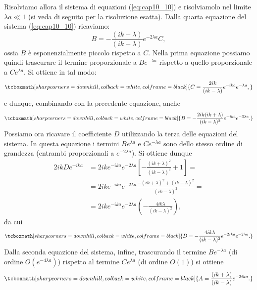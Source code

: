 Risolviamo allora il sistema di equazioni (\ref{eq:cap10_10}) e risolviamolo nel limite ${\lambda a \ll 1}$ (si veda di seguito per la risoluzione esatta). Dalla quarta equazione del sistema (\ref{eq:cap10_10}) ricaviamo:
	\begin{equation}
		B=-\frac{(ik+\lambda)}{(ik-\lambda)}e^{-2 \lambda a } C,
	\end{equation}
ossia $B$ è esponenzialmente piccolo rispetto a $C$.  Nella prima equazione possiamo quindi trascurare il termine proporzionale a $Be^{-\lambda a}$ rispetto a quello proporzionale a $Ce^{\lambda a }$. Si ottiene in tal modo:
	\begin{equation}
		\tcboxmath[sharp corners=downhill, colback=white, colframe=black]{
			C= \frac{2ik}{(ik-\lambda)}e^{-ika}e^{-\lambda a},
			}
	\end{equation}
e dunque, combinando con la precedente equazione, anche
	\begin{equation}
		\tcboxmath[sharp corners=downhill, colback=white, colframe=black]{
			B=-\frac{2ik(ik+\lambda)}{(ik-\lambda)^2}e^{-ik a }e^{-3 \lambda a }.
			}
	\end{equation}
Possiamo ora ricavare il coefficiente $D$ utilizzando la terza delle equazioni del sistema. In questa equazione i termini $Be^{\lambda a }$ e $Ce^{-\lambda a }$ sono dello stesso ordine di grandezza (entrambi proporzionali a $e^{-2\lambda a}$). Si ottiene dunque
	\begin{align}
		2ikDe^{-ika}&= 2ike^{-ika}e^{-2\lambda a} \left[-\frac{(ik+\lambda)^2}{(ik-\lambda)^2}+1\right]= \nonumber \\
		&= 2ike^{-ika}e^{-2\lambda a}\frac{-(ik+\lambda)^2+(ik-\lambda)^2}{(ik-\lambda)^2}= \nonumber \\
		&= 2ike^{-ika}e^{-2\lambda a}\left( -\frac{4ik\lambda}{(ik-\lambda)^2}\right),
	\end{align}
da cui
	\begin{equation}
		\tcboxmath[sharp corners=downhill, colback=white, colframe=black]{
			D= -\frac{4ik\lambda}{(ik-\lambda)^2}e^{-2ika}e^{-2\lambda a}.
			}
	\end{equation}
Dalla seconda equazione del sistema, infine, trascurando il termine $Be^{-\lambda a}$ (di ordine $O(e^{-4\lambda a })$) rispetto al termine $Ce^{\lambda a}$ (di ordine $O(1)$) si ottiene
	\begin{equation}
		\tcboxmath[sharp corners=downhill, colback=white, colframe=black]{
			A=\frac{(ik+\lambda)}{(ik-\lambda)}e^{-2ika}.
			}
	\end{equation}\\
	
